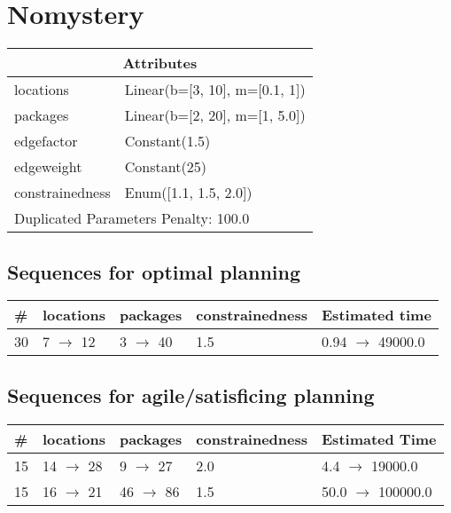\documentclass{article}
\begin{document}
                            \newpage \section{Nomystery}
                    \begin{center}
                    \begin{tabular}{@{}p{}p{}@{}}
                    \multicolumn{2}{c}{\bf \large Attributes}\\\midrule
                    locations & Linear(b=[3, 10], m=[0.1, 1])\\
packages & Linear(b=[2, 20], m=[1, 5.0])\\
edgefactor & Constant(1.5)\\
edgeweight & Constant(25)\\
constrainedness & Enum([1.1, 1.5, 2.0]) \\\midrule
                    \multicolumn{2}{l}{Duplicated Parameters Penalty: 100.0}
                    \end{tabular}
                    \end{center}
                
                            \subsection*{Sequences for optimal planning}

                            \begin{center}
                            \begin{tabular}{@{}l|l|l|l|l@{}}
                            \# & locations & packages & constrainedness & Estimated time\\\midrule
                            30&7 $\rightarrow$ 12&3 $\rightarrow$ 40&1.5&0.94 $\rightarrow$ 49000.0
                            \end{tabular}
                            \end{center}
                    
                         \subsection*{Sequences for agile/satisficing planning}

                        \begin{center}
                        \begin{tabular}{@{}l|l|l|l|l@{}}
                        \# & locations & packages & constrainedness & Estimated Time\\\midrule
                        15&14 $\rightarrow$ 28&9 $\rightarrow$ 27&2.0&4.4 $\rightarrow$ 19000.0\\
15&16 $\rightarrow$ 21&46 $\rightarrow$ 86&1.5&50.0 $\rightarrow$ 100000.0
                        \end{tabular}
                        \end{center}
                    
\end{document}
